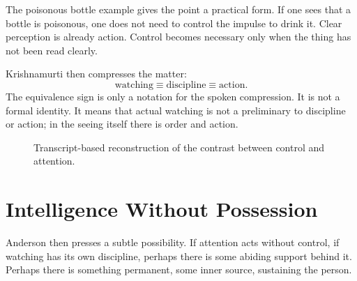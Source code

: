 The poisonous bottle example gives the point a practical form. If one sees that a bottle is poisonous, one does not need to control the impulse to drink it. Clear perception is already action. Control becomes necessary only when the thing has not been read clearly.

Krishnamurti then compresses the matter:
\begin{equation}
\text{watching} \equiv \text{discipline} \equiv \text{action}.
\end{equation}
The equivalence sign is only a notation for the spoken compression. It is not a formal identity. It means that actual watching is not a preliminary to discipline or action; in the seeing itself there is order and action.

\begin{figure}
\centering
{}

Transcript-based reconstruction of the contrast between control and attention.
\end{figure}

\section{Intelligence Without Possession}

Anderson then presses a subtle possibility. If attention acts without control, if watching has its own discipline, perhaps there is some abiding support behind it. Perhaps there is something permanent, some inner source, sustaining the person.

